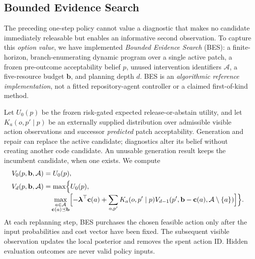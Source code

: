 \documentclass[pdflatex,sn-basic]{sn-jnl}
\begin{document}
\subsection{Bounded Evidence Search}\label{sec:bes}

The preceding one-step policy cannot value a diagnostic that makes
no candidate immediately releasable but enables an informative
second observation. To capture this \emph{option value}, we have
implemented \emph{Bounded Evidence Search} (BES): a
finite-horizon, branch-enumerating dynamic program over a
single active patch, a frozen pre-outcome acceptability belief
$p$, unused intervention identifiers $\mathcal A$, a five-resource
budget $\mathbf b$, and planning depth $d$. BES is an
\emph{algorithmic reference implementation}, not a fitted
repository-agent controller or a claimed first-of-kind method.

Let $U_0(p)$ be the frozen risk-gated expected
release-or-abstain utility, and let $K_a(o,p'\mid p)$ be an
externally supplied distribution over admissible visible
action observations and successor \emph{predicted} patch
acceptability. Generation and repair can replace the active
candidate; diagnostics alter its belief without creating
another code candidate. An unusable generation result keeps
the incumbent candidate, when one exists. We compute
\begin{align}
V_0(p,\mathbf b,\mathcal A)
&=U_0(p),\label{eq:beszero}\\
V_d(p,\mathbf b,\mathcal A)
&=\max\Bigl\{U_0(p),\nonumber\\[-1mm]
&\quad\max_{\substack{a\in\mathcal A\\
 \mathbf c(a)\preceq\mathbf b}}
\Bigl[-\boldsymbol\lambda^\top\mathbf c(a)
 +\sum_{o,p'}K_a(o,p'\mid p)
 V_{d-1}(p',\mathbf b-\mathbf c(a),
 \mathcal A\setminus\{a\})\Bigr]\Bigr\}.
\label{eq:bes}
\end{align}
At each replanning step, BES purchases the chosen feasible
action only after the input probabilities and cost vector
have been fixed. The subsequent visible observation updates
the local posterior and removes the spent action ID. Hidden
evaluation outcomes are never valid policy inputs.
\end{document}
